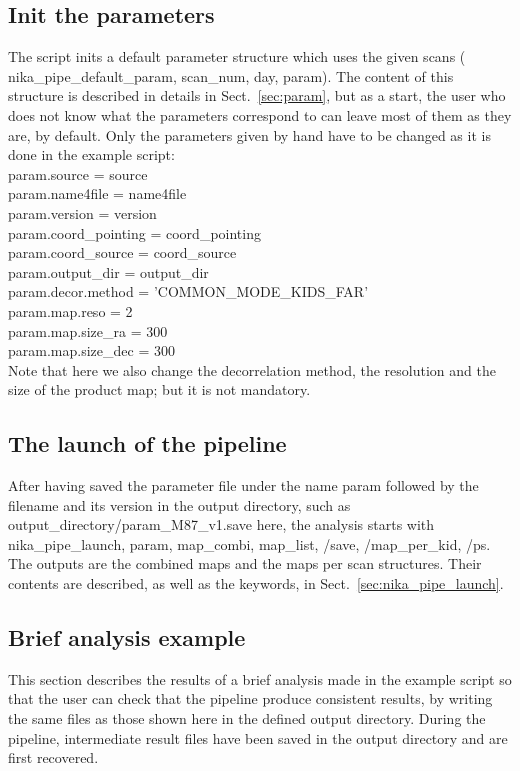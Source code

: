 \documentclass[a4paper]{article}
\begin{document}
\subsection{Init the parameters}
The script inits a default parameter structure which uses the given scans ({\color{blue} nika\_pipe\_default\_param, scan\_num, day, param}). The content of this structure is described in details in Sect.~\ref{sec:param}, but as a start, the user who does not know what the parameters correspond to can leave most of them as they are, by default. Only the parameters given by hand have to be changed as it is done in the example script:\\
{\color{blue} param.source = source\\
param.name4file = name4file\\
param.version = version\\
param.coord\_pointing = coord\_pointing\\
param.coord\_source = coord\_source\\
param.output\_dir = output\_dir\\
param.decor.method = 'COMMON\_MODE\_KIDS\_FAR'\\
param.map.reso = 2\\
param.map.size\_ra = 300\\
param.map.size\_dec = 300}\\
Note that here we also change the decorrelation method, the resolution and the size of the product map; but it is not mandatory.

\subsection{The launch of the pipeline}
After having saved the parameter file under the name param followed by the filename and its version in the output directory, such as 
{\color{blue} output\_directory/param\_M87\_v1.save} here, the analysis starts with {\color{blue} nika\_pipe\_launch, param, map\_combi, map\_list, /save, /map\_per\_kid, /ps}. The outputs are the combined maps and the maps per scan structures. Their contents are described, as well as the keywords, in Sect.~\ref{sec:nika_pipe_launch}.

\subsection{Brief analysis example}
This section describes the results of a brief analysis made in the example script so that the user can check that the pipeline produce consistent results, by writing the same files as those shown here in the defined output directory. During the pipeline, intermediate result files have been saved in the output directory and are first recovered. 
\end{document}
